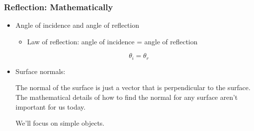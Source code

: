 \documentclass[12pt]{beamer}
\begin{document}
  \begin{frame}
    \frametitle{Reflection: Mathematically}
    \begin{itemize}
      \item Angle of incidence and angle of reflection
      \begin{itemize}
        \item Law of reflection: angle of incidence = angle of reflection

        \[
          \theta_i = \theta_r
        \]
      \end{itemize}
      \item Surface normals:

      The normal of the surface is just a vector that is perpendicular to the surface.
      The mathematical details of how to find the normal for any surface aren't important for us today.

      We'll focus on simple objects.



\end{itemize}
\end{frame}
\end{document}

